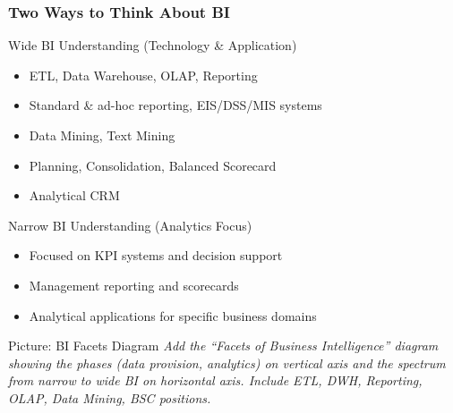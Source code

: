 \begin{frame}
  \frametitle{Two Ways to Think About BI}

  \begin{block}{Wide BI Understanding (Technology \& Application)}
    \begin{itemize}
      \item ETL, Data Warehouse, OLAP, Reporting
      \item Standard \& ad-hoc reporting, EIS/DSS/MIS systems
      \item Data Mining, Text Mining
      \item Planning, Consolidation, Balanced Scorecard
      \item Analytical CRM
    \end{itemize}
  \end{block}

  \begin{block}{Narrow BI Understanding (Analytics Focus)}
    \begin{itemize}
      \item Focused on KPI systems and decision support
      \item Management reporting and scorecards
      \item Analytical applications for specific business domains
    \end{itemize}
  \end{block}

  \begin{alertblock}{Picture: BI Facets Diagram}
    \textit{Add the ``Facets of Business Intelligence'' diagram showing the
    phases (data provision, analytics) on vertical axis and the spectrum from
    narrow to wide BI on horizontal axis. Include ETL, DWH, Reporting, OLAP,
    Data Mining, BSC positions.}
  \end{alertblock}
\end{frame}


